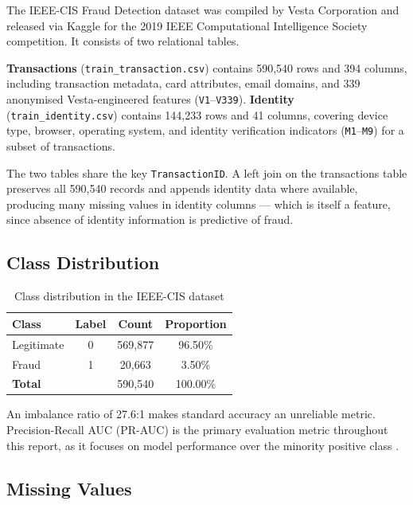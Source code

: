 \documentclass[12pt, a4paper]{article}
\begin{document}
The IEEE-CIS Fraud Detection dataset \cite{ieee2019kaggle} was compiled by Vesta
Corporation and released via Kaggle for the 2019 IEEE Computational Intelligence
Society competition. It consists of two relational tables.

\textbf{Transactions} (\texttt{train\_transaction.csv}) contains 590,540 rows and
394 columns, including transaction metadata, card attributes, email domains, and
339 anonymised Vesta-engineered features (\texttt{V1}--\texttt{V339}).
\textbf{Identity} (\texttt{train\_identity.csv}) contains 144,233 rows and 41
columns, covering device type, browser, operating system, and identity verification
indicators (\texttt{M1}--\texttt{M9}) for a subset of transactions.

The two tables share the key \texttt{TransactionID}. A left join on the transactions
table preserves all 590,540 records and appends identity data where available,
producing many missing values in identity columns --- which is itself a feature,
since absence of identity information is predictive of fraud.

\subsection{Class Distribution}

\begin{table}[H]
    \centering
    \caption{Class distribution in the IEEE-CIS dataset}
    \label{tab:class_dist}
    \begin{tabular}{lccc}
        \toprule
        \textbf{Class} & \textbf{Label} & \textbf{Count} & \textbf{Proportion} \\
        \midrule
        Legitimate & 0 & 569,877 & 96.50\% \\
        Fraud      & 1 &  20,663 &  3.50\% \\
        \midrule
        \textbf{Total} & & 590,540 & 100.00\% \\
        \bottomrule
    \end{tabular}
\end{table}

An imbalance ratio of 27.6:1 makes standard accuracy an unreliable metric.
Precision-Recall AUC (PR-AUC) is the primary evaluation metric throughout this
report, as it focuses on model performance over the minority positive class
\cite{saito2015}.

\subsection{Missing Values}
\end{document}
